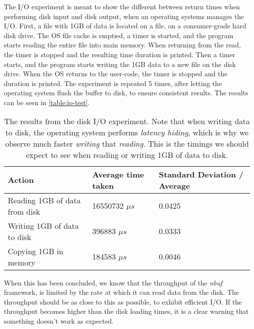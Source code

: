 \documentclass[a4paper]{article}
\newcommand{\nbuf}{\textit{nbuf} }
\begin{document}
The I/O experiment is meant to show the different between return times when performing disk input and disk output, when an operating systems manages the I/O. First, a file with 1GB of data is located on a file, on a consumer-grade hard disk drive. The OS file cache is emptied, a timer is started, and the program starts reading the entire file into main memory. When returning from the read, the timer is stopped and the resulting time duration is printed. Then a timer starts, and the program starts writing the 1GB data to a new file on the disk drive. When the OS returns to the user-code, the timer is stopped and the duration is printed. The experiment is repeated 5 times, after letting the operating system flush the buffer to disk, to ensure consistent results. The results can be seen in \autoref{table:io-test}.\\

\begin{table}[]
\begin{adjustwidth}{-0.5in}{-0.5in}
\centering
\begin{tabular}{@{}lll@{}}
\toprule
\textbf{Action}                & \textbf{Average time taken}               & \textbf{Standard Deviation / Average} \\ \midrule
Reading 1GB of data from disk  & 16550732 $\mu s$                          & 0.0425                                \\ \midrule
Writing 1GB of data to disk    & 396883   $\mu s$                          & 0.0333                                \\ \midrule
Copying 1GB in memory          & 184583   $\mu s$                          & 0.0046                                \\ \bottomrule
\end{tabular}
\caption{The results from the disk I/O experiment. Note that when writing data to disk, the operating system performs \textit{latency hiding}, which is why we observe much faster \textit{writing} that \textit{reading}. This is the timings we should expect to see when reading or writing 1GB of data to disk.}
\label{table:io-test}
\end{adjustwidth}
\end{table}


When this has been concluded, we know that the throughput of the \nbuf framework, is limited by the rate at which it can read data from the disk. The throughput should be as close to this as possible, to exhibit efficient I/O. If the throughput becomes higher than the disk loading times, it is a clear warning that something doesn't work as expected.
\end{document}
